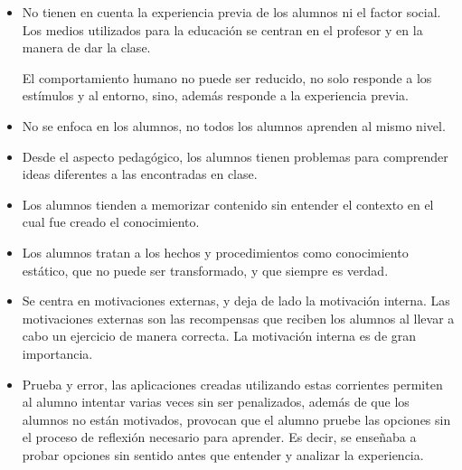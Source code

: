 \begin{itemize}

\item No tienen en cuenta la experiencia previa de los alumnos ni el factor
    social. Los medios utilizados para la educación se centran en el profesor y
    en la manera de dar la clase\cite{siemens2008learning,sawyer2005cambridge}.

    El comportamiento humano no puede ser reducido, no solo responde a los
    estímulos y al entorno, sino, además responde a la experiencia
    previa\cite{weegar2012comparison}.

\item No se enfoca en los alumnos, no todos los alumnos aprenden al mismo
    nivel\cite{johnson2005instructionism}.

\item Desde el aspecto pedagógico, los alumnos tienen problemas para comprender
    ideas diferentes a las encontradas en clase\cite{sawyer2005cambridge}.

\item Los alumnos tienden a memorizar contenido sin entender el contexto en el
    cual fue creado el conocimiento\cite{sawyer2005cambridge}. 
    
\item Los alumnos tratan a los hechos y procedimientos como conocimiento
    estático, que no puede ser transformado, y que siempre es
    verdad\cite{sawyer2005cambridge}.

\item Se centra en motivaciones externas, y deja de lado la motivación interna.
    Las motivaciones externas son las recompensas que reciben los alumnos al
    llevar a cabo un ejercicio de manera correcta. La motivación interna es de
    gran importancia\cite{weegar2012comparison}.
    
\item Prueba y error, las aplicaciones creadas utilizando estas corrientes
    permiten al alumno intentar varias veces sin ser penalizados, además de que
    los alumnos no están motivados, provocan que el alumno pruebe las opciones
    sin el proceso de reflexión necesario para aprender. Es decir, se enseñaba a
    probar opciones sin sentido antes que entender y analizar la
    experiencia\cite{charsky:2010,egenfeldt2007third,bruckman1999can}.

\end{itemize}

